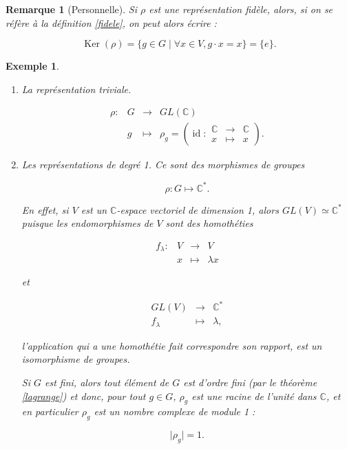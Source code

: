 \documentclass[french]{article}
\newtheorem*{remark}{Remarque}
\newtheorem*{exemple}{Exemple}
\begin{document}
\begin{remark}[Personnelle]
  Si \(\rho\) est une représentation fidèle, alors, si on se réfère à la définition \ref{fidele}, on peut alors écrire :

  \[\operatorname{Ker}(\rho) = \{ g \in G \mid \forall x \in V, g \cdot x = x \} = \{ e \}. \]
\end{remark}

\begin{exemple}

  \

  \begin{enumerate}
    \item \emph{La représentation triviale.}

    \[\begin{matrix}
    \rho : & G & \longrightarrow & GL(\mathbb{C}) \\
    \ & g & \longmapsto & \rho_g = \left(\operatorname{id} :\begin{matrix}
    \mathbb{C} & \longrightarrow & \mathbb{C} \\
    x & \longmapsto & x
    \end{matrix}\right).
    \end{matrix}\]

    \item \emph{Les représentations de degré 1.} Ce sont des morphismes de groupes

    \[\rho : G \longmapsto \mathbb{C} ^{*}.\]

    En effet, si \(V\) est un \(\mathbb{C}\)-espace vectoriel de dimension 1, alors \(GL(V) \simeq \mathbb{C}^{*}\) puisque les endomorphismes de \(V\) sont des homothéties

    \[\begin{matrix}
    f_{\lambda} : & V & \longrightarrow & V \\
    \ & x & \longmapsto & \lambda x
    \end{matrix}\]

    et

    \[\begin{matrix}
    GL(V) & \longrightarrow & \mathbb{C}^{*} \\
    f _{\lambda} & \longmapsto & \lambda,
    \end{matrix}\]

    l'application qui a une homothétie fait correspondre son rapport, est un isomorphisme de groupes.

    Si \(G\) est fini, alors tout élément de \(G\) est d'ordre fini (par le théorème \ref{lagrange}) et donc, pour tout \(g \in G\), \(\rho_g\) est une racine de l'unité dans \(\mathbb{C}\), et en particulier \(\rho_g\) est un nombre complexe de module 1 :

    \[\lvert \rho_g \rvert=1.\]
  \end{enumerate}
\end{exemple}
\end{document}

